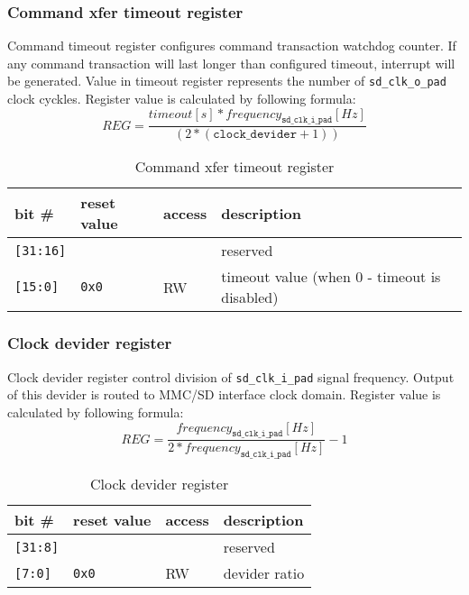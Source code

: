     \subsubsection{Command xfer timeout register}
    \label{sec:timeout_reg}
    
    Command timeout register configures command transaction watchdog counter. If any command transaction will last longer than configured timeout, 
    interrupt will be generated. Value in timeout register represents the number of \texttt{sd\_clk\_o\_pad} clock cyckles. 
    Register value is calculated by following formula:
    \begin{equation}
    REG = \frac{timeout[s] * frequency_{\texttt{sd\_clk\_i\_pad}}[Hz]}{(2*(\texttt{clock\_devider} + 1))}
    \end{equation} 
    
    \begin{table}[H]
    \caption{Command xfer timeout register}
        \begin{tabular}{m{1.3cm}|m{2cm}|m{1cm}|m{8cm}}
                \rowcolor[gray]{0.7} bit \# & reset value & access & description \\ \hline \hline
                \texttt{[31:16]} & & & reserved \\ \hline
                \texttt{[15:0]} & \texttt{0x0} & RW & timeout value (when 0 - timeout is disabled) \\ \hline
                \hline
        \end{tabular}
        \label{tab:timeout_reg}
    \end{table}
    
    \subsubsection{Clock devider register}
    \label{sec:div_reg}
    
    Clock devider register control division of \texttt{sd\_clk\_i\_pad} signal frequency. Output of this devider is routed to MMC/SD interface clock domain.
    Register value is calculated by following formula:
    \begin{equation}
    REG = \frac{frequency_{\texttt{sd\_clk\_i\_pad}}[Hz]}{2*frequency_{\texttt{sd\_clk\_i\_pad}}[Hz]} - 1
    \end{equation} 
    
    \begin{table}[H]
    \caption{Clock devider register}
        \begin{tabular}{m{1.3cm}|m{2cm}|m{1cm}|m{8cm}}
                \rowcolor[gray]{0.7} bit \# & reset value & access & description \\ \hline \hline
                \texttt{[31:8]} & & & reserved \\ \hline
                \texttt{[7:0]} & \texttt{0x0} & RW & devider ratio \\ \hline
                \hline
        \end{tabular}
        \label{tab:div_reg}
    \end{table}
    
